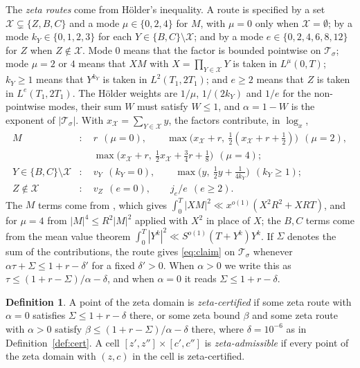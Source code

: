 \documentclass[11pt]{amsart}
\theoremstyle{definition}
\newtheorem{definition}[theorem]{Definition}
\theoremstyle{remark}
\begin{document}
The \emph{zeta routes} come from Hölder's inequality. A route is specified by a set $\mathcal X\subsetneq\{Z,B,C\}$ and a mode $\mu\in\{0,2,4\}$ for $M$, with $\mu=0$ only when $\mathcal X=\emptyset$; by a mode $k_Y\in\{0,1,2,3\}$ for each $Y\in\{B,C\}\setminus\mathcal X$; and by a mode $e\in\{0,2,4,6,8,12\}$ for $Z$ when $Z\notin\mathcal X$. Mode $0$ means that the factor is bounded pointwise on $\mathcal T_\sigma$; mode $\mu=2$ or $4$ means that $XM$ with $X=\prod_{Y\in\mathcal X}Y$ is taken in $L^{\mu}(0,T)$; $k_Y\ge1$ means that $Y^{k_Y}$ is taken in $L^2(T_1,2T_1)$; and $e\ge2$ means that $Z$ is taken in $L^e(T_1,2T_1)$. The Hölder weights are $1/\mu$, $1/(2k_Y)$ and $1/e$ for the non-pointwise modes, their sum $W$ must satisfy $W\le1$, and $\alpha=1-W$ is the exponent of $|\mathcal T_\sigma|$. With $x_{\mathcal X}=\sum_{Y\in\mathcal X}y$, the factors contribute, in $\log_x$,
\begin{align*}
M&:\quad r\ \ (\mu=0),\qquad \max\big(x_{\mathcal X}+r,\ \tfrac12(x_{\mathcal X}+r+\tfrac12)\big)\ \ (\mu=2),\\
&\phantom{:}\quad \max\big(x_{\mathcal X}+r,\ \tfrac12x_{\mathcal X}+\tfrac34r+\tfrac18\big)\ \ (\mu=4);\\
Y\in\{B,C\}\setminus\mathcal X&:\quad v_Y\ \ (k_Y=0),\qquad \max\big(y,\ \tfrac12y+\tfrac1{4k_Y}\big)\ \ (k_Y\ge1);\\
Z\notin\mathcal X&:\quad v_Z\ \ (e=0),\qquad j_e/e\ \ (e\ge2).
\end{align*}
The $M$ terms come from \cite[Proposition~2.2]{J}, which gives $\int_0^T|XM|^2\ll x^{o(1)}(X^2R^2+XRT)$, and for $\mu=4$ from $|M|^4\le R^2|M|^2$ applied with $X^2$ in place of $X$; the $B,C$ terms come from the mean value theorem $\int_0^T|Y^{k}|^2\ll S^{o(1)}(T+Y^{k})Y^{k}$. If $\Sigma$ denotes the sum of the contributions, the route gives \eqref{eq:claim} on $\mathcal T_\sigma$ whenever $\alpha\tau+\Sigma\le 1+r-\delta'$ for a fixed $\delta'>0$. When $\alpha>0$ we write this as $\tau\le(1+r-\Sigma)/\alpha-\delta$, and when $\alpha=0$ it reads $\Sigma\le1+r-\delta$.

\begin{definition}\label{def:zcert}
A point of the zeta domain is \emph{zeta-certified} if some zeta route with $\alpha=0$ satisfies $\Sigma\le1+r-\delta$ there, or some zeta bound $\beta$ and some zeta route with $\alpha>0$ satisfy $\beta\le(1+r-\Sigma)/\alpha-\delta$ there, where $\delta=10^{-6}$ as in Definition~\ref{def:cert}. A cell $[z',z'']\times[c',c'']$ is \emph{zeta-admissible} if every point of the zeta domain with $(z,c)$ in the cell is zeta-certified.
\end{definition}
\end{document}
